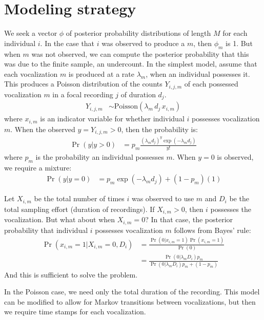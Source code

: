 \documentclass[reqno ,11pt]{amsart}
\begin{document}
\section{Modeling strategy}

We seek a vector $\phi$ of posterior probability distributions of length $M$ for each individual $i$. In the case that $i$ was observed to produce a $m$, then $\phi_m$ is 1. But when $m$ was not observed, we can compute the posterior probability that this was due to the finite sample, an undercount. 
In the simplest model, assume that each vocalization $m$ is produced at a rate $\lambda_m$, when an individual possesses it. This produces a Poisson distribution of the counts $Y_{i,j,m}$ of each possessed vocalization $m$ in a focal recording $j$ of duration $d_j$.
\begin{align*}
Y_{i,j,m} &\sim \mathrm{Poisson}(  \lambda_m \, d_j \, x_{i,m} )
\end{align*}
where $x_{i,m}$ is an indicator variable for whether individual $i$ possesses vocalization $m$. 
When the observed $y=Y_{i,j,m}>0$, then the probability is:
\begin{align*}
\Pr(y|y>0) &= p_{m} \frac{( \lambda_m d_j )^y \exp(-\lambda_m d_j) }{ y! }
\end{align*}
where $p_m$ is the probability an individual possesses $m$. When $y=0$ is observed, we require a mixture:
\begin{align*}
\Pr(y|y=0) &= p_{m} \exp(-\lambda_m d_j) + (1-p_{m})(1)
\end{align*}

Let $X_{i,m}$ be the total number of times $i$ was observed to use $m$ and $D_{i}$ be the total sampling effort (duration of recordings). If $X_{i,m}>0$, then $i$ possesses the vocalization. But what about when $X_{i,m}=0$? In that case, the posterior probability that individual $i$ possesses vocalization $m$ follows from Bayes' rule:
\begin{align*}
	\Pr(x_{i,m}=1|X_{i,m}=0,D_{i}) &= \frac{\Pr(0|x_{i,m}=1)\Pr(x_{i,m}=1)}{\Pr(0)} \\ 
	&= \frac{\Pr(0|\lambda_m D_{i})p_m}{\Pr(0|\lambda_m D_{i})p_m + (1-p_m)}
\end{align*}
And this is sufficient to solve the problem.

In the Poisson case, we need only the total duration of the recording. 
This model can be modified to allow for Markov transitions between vocalizations, but then we require time stamps for each vocalization. 
\end{document}
